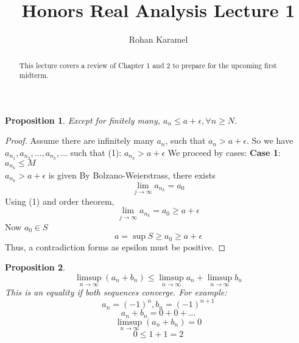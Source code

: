 \documentclass[12pt,reqno]{amsart}
\title{Honors Real Analysis Lecture 1}
\author{Rohan Karamel}
\theoremstyle{plain}
\newtheorem*{proposition}{Proposition}
\begin{document}
    \begin{abstract}
        This lecture covers a review of Chapter 1 and 2 to prepare for the upcoming first midterm.
    \end{abstract}

    \maketitle

    \begin{proposition}
        Except for finitely many, $a_n \le a + \epsilon, \forall n \ge N$.
    \end{proposition}

    \begin{proof}
        Assume there are infinitely many $a_n$, such that $a_n > a + \epsilon$.
        So we have $a_{n_1}, a_{n_2}, \dots, a_{n_k}, \dots$ such that (1): $a_{n_k} > a + \epsilon$
        We proceed by cases:
        \textbf{Case 1}: $a_{n_k} \le M$ \\
        $a_{n_k} > a + \epsilon$ is given
        By Bolzano-Weierstrass, there exists
        \[ \lim_{j \to \infty} a_{n_k} = a_0\]
        Using (1) and order theorem,
        \[ \lim_{j \to \infty} a_{n_k} = a_0 \ge a + \epsilon\]
        Now $a_0 \in S$
        \[ a = \sup S \ge a_0 \ge a + \epsilon\]
        Thus, a contradiction forms as epsilon must be positive.
    \end{proof}

    \begin{proposition}
        \[ \limsup_{n\to\infty} (a_n + b_n) \le \limsup_{n\to\infty} a_n + \limsup_{n\to\infty} b_n \]
        This is an equality if both sequences converge. For example:
        \[ a_n = {(-1)}^n, b_n = {(-1)}^{n+1} \]
        \[ a_n + b_n = 0 + 0 + \dots \]
        \[ \limsup_{n\to\infty} (a_n + b_n) = 0 \]
        \[ 0 \le 1 + 1 = 2\]
    \end{proposition}
\end{document}
